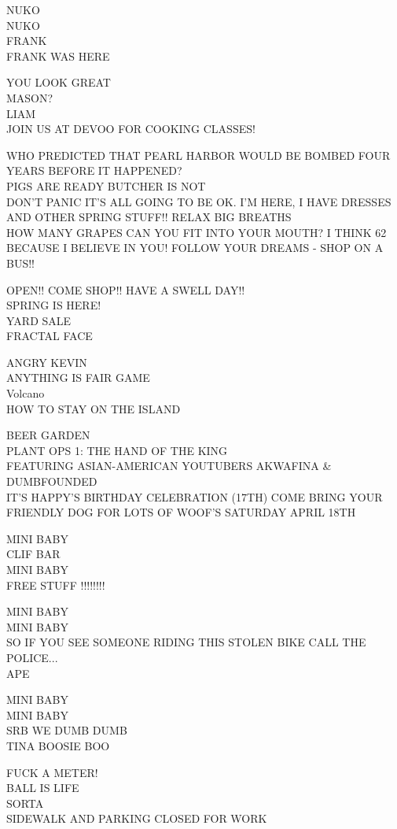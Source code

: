 \documentclass[10pt,letterpaper]{article}
\begin{document}
NUKO\\
NUKO\\
FRANK\\
FRANK WAS HERE

YOU LOOK GREAT\\
MASON?\\
LIAM\\
JOIN US AT DEVOO FOR COOKING CLASSES!

WHO PREDICTED THAT PEARL HARBOR WOULD BE BOMBED FOUR YEARS BEFORE IT HAPPENED?\\
PIGS ARE READY BUTCHER IS NOT\\
DON'T PANIC IT'S ALL GOING TO BE OK.  I'M HERE, I HAVE DRESSES AND OTHER SPRING STUFF!!  RELAX BIG BREATHS\\
HOW MANY GRAPES CAN YOU FIT INTO YOUR MOUTH?  I THINK 62 BECAUSE I BELIEVE IN YOU!  FOLLOW YOUR DREAMS {-} SHOP ON A BUS!!

OPEN!! COME SHOP!! HAVE A SWELL DAY!!\\
SPRING IS HERE!\\
YARD SALE\\
FRACTAL FACE

ANGRY KEVIN\\
ANYTHING IS FAIR GAME\\
Volcano\\
HOW TO STAY ON THE ISLAND

BEER GARDEN\\
PLANT OPS 1: THE HAND OF THE KING\\
FEATURING ASIAN{-}AMERICAN YOUTUBERS AKWAFINA \& DUMBFOUNDED\\
IT'S HAPPY'S BIRTHDAY CELEBRATION (17TH) COME BRING YOUR FRIENDLY DOG FOR LOTS OF WOOF'S SATURDAY APRIL 18TH

MINI BABY\\
CLIF BAR\\
MINI BABY\\
FREE STUFF !!!!!!!!

MINI BABY\\
MINI BABY\\
SO IF YOU SEE SOMEONE RIDING THIS STOLEN BIKE CALL THE POLICE...\\
APE

MINI BABY\\
MINI BABY\\
SRB WE DUMB DUMB\\
TINA BOOSIE BOO

FUCK A METER!\\
BALL IS LIFE\\
SORTA\\
SIDEWALK AND PARKING CLOSED FOR WORK
\end{document}
